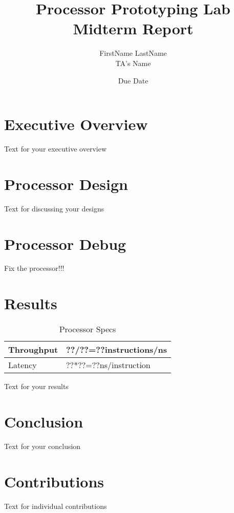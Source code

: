 \documentclass[12pt]{article}
\title{ Processor Prototyping Lab \\
        Midterm Report}
\author{FirstName LastName \\
        TA's Name}
\date{Due Date}
\begin{document}
  \maketitle

  \section{Executive Overview}
  
  Text for your executive overview

  \section{Processor Design}

%


  Text for discussing your designs %

	\section{Processor Debug}

	Fix the processor!!!

  \section{Results}

  \begin{table}[!hbp]

    \begin{tabular}{|p{}|p{}|}
      \hline
      Throughput & ??/??=??instructions/ns \\ \hline
      Latency & ??*??=??ns/instruction \\ \hline
    \end{tabular}

    \caption{Processor Specs}
		\label{tb:procspec}
  \end{table}

  Text for your results

  \section{Conclusion}

  Text for your conclusion

  \section{Contributions}

  Text for individual contributions
\end{document}
